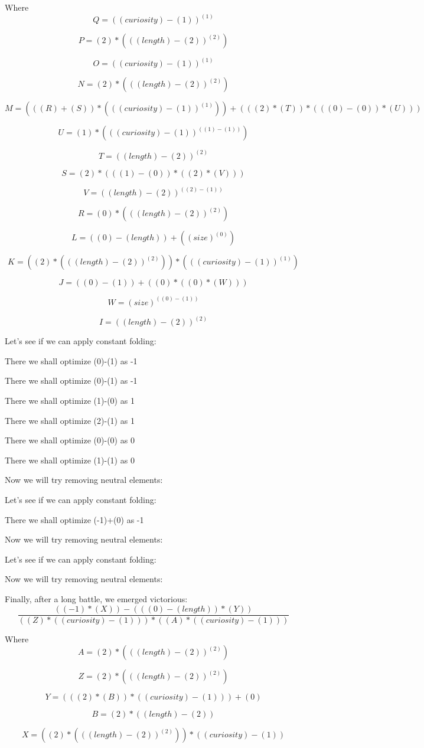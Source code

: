 \documentclass[12pt, letterpaper, twoside]{article}
\begin{document}
Where 
\[Q = {({(curiosity)}-{(1)})}^{(1)}\]

\[P = {(2)}*{({({(length)}-{(2)})}^{(2)})}\]

\[O = {({(curiosity)}-{(1)})}^{(1)}\]

\[N = {(2)}*{({({(length)}-{(2)})}^{(2)})}\]

\[M = {({({(R)}+{(S)})}*{({({(curiosity)}-{(1)})}^{(1)})})}+{({({(2)}*{(T)})}*{({({(0)}-{(0)})}*{(U)})})}\]

\[U = {(1)}*{({({(curiosity)}-{(1)})}^{({(1)}-{(1)})})}\]

\[T = {({(length)}-{(2)})}^{(2)}\]

\[S = {(2)}*{({({(1)}-{(0)})}*{({(2)}*{(V)})})}\]

\[V = {({(length)}-{(2)})}^{({(2)}-{(1)})}\]

\[R = {(0)}*{({({(length)}-{(2)})}^{(2)})}\]

\[L = {({(0)}-{(length)})}+{({(size)}^{(0)})}\]

\[K = {({(2)}*{({({(length)}-{(2)})}^{(2)})})}*{({({(curiosity)}-{(1)})}^{(1)})}\]

\[J = {({(0)}-{(1)})}+{({(0)}*{({(0)}*{(W)})})}\]

\[W = {(size)}^{({(0)}-{(1)})}\]

\[I = {({(length)}-{(2)})}^{(2)}\]


Let's see if we can apply constant folding:

There we shall optimize
{(0)}-{(1)}
as -1

There we shall optimize
{(0)}-{(1)}
as -1

There we shall optimize
{(1)}-{(0)}
as 1

There we shall optimize
{(2)}-{(1)}
as 1

There we shall optimize
{(0)}-{(0)}
as 0

There we shall optimize
{(1)}-{(1)}
as 0

Now we will try removing neutral elements:

Let's see if we can apply constant folding:

There we shall optimize
{(-1)}+{(0)}
as -1

Now we will try removing neutral elements:

Let's see if we can apply constant folding:

Now we will try removing neutral elements:

Finally, after a long battle, we emerged victorious:
\[\frac{{({(-1)}*{(X)})}-{({({(0)}-{(length)})}*{(Y)})}}{{({(Z)}*{({(curiosity)}-{(1)})})}*{({(A)}*{({(curiosity)}-{(1)})})}}\]

Where 
\[A = {(2)}*{({({(length)}-{(2)})}^{(2)})}\]

\[Z = {(2)}*{({({(length)}-{(2)})}^{(2)})}\]

\[Y = {({({(2)}*{(B)})}*{({(curiosity)}-{(1)})})}+{(0)}\]

\[B = {(2)}*{({(length)}-{(2)})}\]

\[X = {({(2)}*{({({(length)}-{(2)})}^{(2)})})}*{({(curiosity)}-{(1)})}\]
\end{document}
